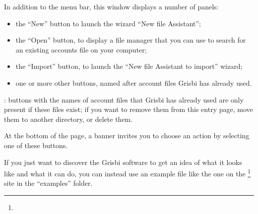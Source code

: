 
In addition to the menu bar, this window displays a number of panels:%

\begin{itemize}
	\item the \enquote{New} button to launch the wizard \enquote{New file Assistant};%
	\item the \enquote{Open} button, to display a file manager that you can use to search for an existing accounts file on your computer;%
	\item the \enquote{Import} button, to launch the \enquote{New file Assistant to import} wizard;%
	\item one or more other buttons, named after account files Grisbi has already used.%
\end{itemize}


\Note{}: buttons with the names of account files that Grisbi has already used are only present if these files exist; if you want to remove them from this entry page, move them to another directory, or delete them.%


At the bottom of the page, a banner invites you to choose an action by selecting one of these buttons.%


If you just want to discover the Grisbi software to get an idea of what it looks like and what it can do, you can instead use an example file like the one on the \footnote{\urlSourceForgeDocumentation{}} site in the \enquote{\textsf{examples}} folder.%

